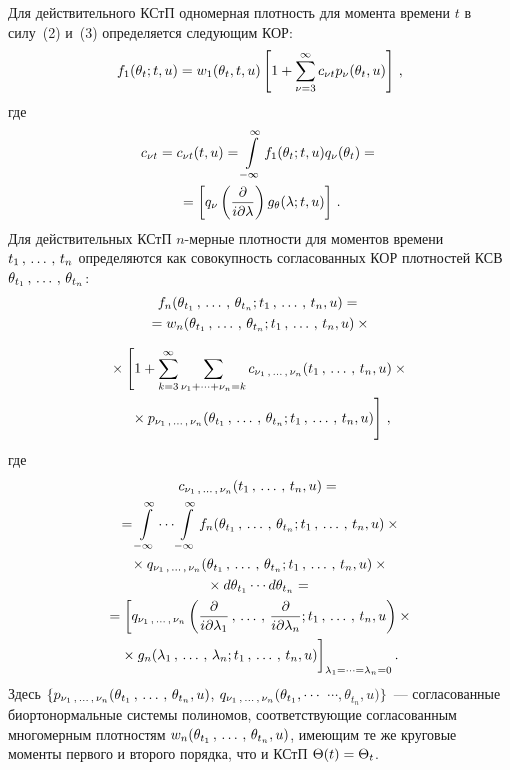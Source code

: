 \begin{multicols}{2}
Для действительного КСтП одномерная плот\-ность для 
момента времени $t$ в силу~(2) и~(3) определяется следующим КОР:
\begin{equation}
f_1 (\theta_t; t,u) = w_1(\theta_t, t,u) \left[ 
1 + \sum\limits_{\nu=3}^\infty c_{\nu t} p_\nu (\theta_t,u) \right]\,,\label{e5s}
\end{equation}
где
\begin{multline*}
c_{\nu t}=c_{\nu t} (t,u)= \int\limits_{-\infty}^\infty f_1(\theta_t;t,u) q_\nu(\theta_t) = {}\\
{}=
\left[ q_\nu \left(\displaystyle\frac{\displaystyle \partial\mathstrut}{\displaystyle i \partial \lambda\mathstrut}\right) g_\theta (\lambda;t,u)\right]\,.
\end{multline*}
Для действительных КСтП $n$-мер\-ные плот\-ности для моментов времени  $t_1\,,\,\ldots\,,\, t_n$ 
определяются как совокупность согласованных КОР плот\-ностей КСВ  
$\theta_{t_1} \,,\,\ldots\,,\, \theta_{t_n}$:
\begin{multline*}
 f_n (\theta_{t_1}\,,\,\ldots\,,\, \theta_{t_n}; t_1\,,\,\ldots\,,\, t_n,u) ={}\\
 {}=
 w_n (\theta_{t_1}\,,\,\ldots\,,\, \theta_{t_n}; t_1\,,\,\ldots\,,\, t_n,u)\times{}
 \end{multline*}
 
 \noindent
 \begin{multline}
{}\times \left[ 1+ \sss_{k=3}^\infty \sss_{\nu_1+\cdots+\nu_n =k} 
c_{\nu_1 \tr \nu_n} (t_1\tr t_n,u) \times{}\right.\\
\left.{}\times p_{\nu_1\tr \nu_n} (\theta_{t_1} \tr \theta_{t_n}; t_1\tr t_n,u) 
\vphantom{\sum\limits_{k=3}^\infty}\right]\,,
\label{e7s}
\end{multline}
где
\begin{multline*}
c_{\nu_1\,,\,\ldots\,,\, \nu_n} (t_1\,,\,\ldots\,,\, t_n,u) = {}\\
{}=\int\limits_{-\infty}^\infty\cdots \int\limits_{-\infty}^\infty f_n (\theta_{t_1}\,,\,\ldots\,,\, \theta_{t_n}; t_1\,,\,\ldots\,,\, t_n,u)\times{}\\
{}\times q_{\nu_1\,,\,\ldots\,,\, \nu_n}(\theta_{t_1}\,,\,\ldots\,,\, \theta_{t_n}; t_1\,,\,\ldots\,,\, t_n,u)\times{}\\
{}\times d\theta_{t_1}\cdots  d\theta_{t_n}={}\\
{}= \biggl[ q_{\nu_1\,,\,\ldots\,,\, \nu_n} \left( \displaystyle\frac{\displaystyle \partial\mathstrut}{\displaystyle  i\partial \lambda_1\mathstrut}\,,\,\ldots\,,\, \displaystyle\frac{\displaystyle \partial\mathstrut}{\displaystyle i\partial \lambda_n\mathstrut}; 
t_1\,,\,\ldots\,,\, t_n,u\right)\times{}\\
{}\times g_n (\lambda_1\,,\,\ldots\,,\, \lambda_n; t_1\,,\,\ldots\,,\, t_n,u)\biggr]_{\lambda_1 =\cdots = \lambda_n=0}\,.
\end{multline*}
Здесь $\{ p_{\nu_1\,,\,\ldots\,,\, \nu_n} (\theta_{t_1}\,,\,\ldots\,,\, \theta_{t_n},u)$, 
$q_{\nu_1\,,\,\ldots\,,\, \nu_n} (\theta_{t_1} , \cdots$\linebreak 
$\cdots , \theta_{t_n},u)\}$~--- согласованные биортонормальные 
сис\-те\-мы полиномов, соответствующие согласованным многомерным плотностям 
$w_n (\theta_{t_1}\,,\,\ldots\,,\, \theta_{t_n},u)$, имеющим те же круговые моменты первого и второго порядка, 
что и КСтП $\Theta(t)\hm=\Theta_t$.


\end{multicols}
